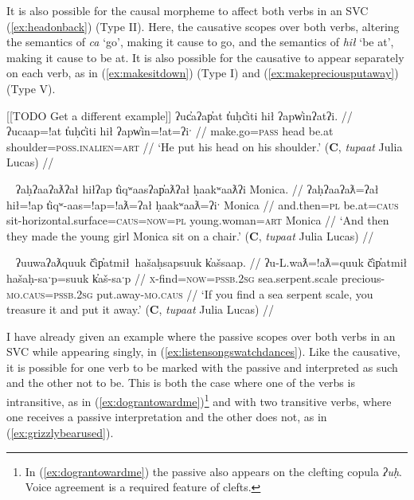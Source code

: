 It is also possible for the causal morpheme to affect both verbs in an SVC (\ref{ex:headonback}) (Type II). Here, the causative scopes over both verbs, altering the semantics of \textit{ca} `go', making it cause to go, and the semantics of \textit{hił} `be at', making it cause to be at. It is also possible for the causative to appear separately on each verb, as in (\ref{ex:makesitdown}) (Type I) and (\ref{ex:makepreciousputaway}) (Type V).

[[TODO Get a different example]]
\ex \label{ex:headonback}
\begingl
\glpreamble ʔuc̓aʔap̓at t̓uḥc̓iti hił ʔapw̓inʔatʔi. //
\gla ʔucaap=!at t̓uḥc̓iti hił ʔapw̓in=!at=ʔiˑ //
\glb make.go=\textsc{pass} head be.at shoulder=\textsc{poss.inalien}=\textsc{art} //
\glft `He put his head on his shoulder.' (\textbf{C}, \textit{tupaat} Julia Lucas) //
\endgl
\xe

\ex~ \label{ex:makesitdown}
\begingl
\glpreamble ʔaḥʔaaʔaƛʔał hiłʔap t̓iqʷaasʔap̓aƛʔał ḥaakʷaaƛʔi Monica. //
\gla ʔaḥʔaaʔaƛ=ʔał hił=!ap t̓iqʷ-aas=!ap=!aƛ=ʔał ḥaakʷaaƛ=ʔiˑ Monica //
\glb and.then=\textsc{pl} be.at=\textsc{caus} sit-horizontal.surface=\textsc{caus}=\textsc{now}=\textsc{pl} young.woman=\textsc{art} Monica //
\glft `And then they made the young girl Monica sit on a chair.' (\textbf{C}, \textit{tupaat} Julia Lucas) //
\endgl
\xe

\ex~ \label{ex:makepreciousputaway}
\begingl
\glpreamble ʔuuwaʔaƛquuk č̓ip̓atmił\footnotemark\ hašaḥsapsuuk k̓ašsaap. //
\gla ʔu-L.waƛ=!aƛ=quuk č̓ip̓atmił hašaḥ-saˑp=suuk k̓aš-saˑp //
\glb \textsc{x}-find=\textsc{now}=\textsc{pssb.2sg} sea.serpent.scale precious-\textsc{mo.caus}=\textsc{pssb.2sg} put.away-\textsc{mo.caus} //
\glft `If you find a sea serpent scale, you treasure it and put it away.' (\textbf{C}, \textit{tupaat} Julia Lucas) //
\endgl
\xe


I have already given an example where the passive scopes over both verbs in an SVC while appearing singly, in (\ref{ex:listensongswatchdances}). Like the causative, it is possible for one verb to be marked with the passive and interpreted as such and the other not to be. This is both the case where one of the verbs is intransitive, as in (\ref{ex:dograntowardme})\footnote{In (\ref{ex:dograntowardme}) the passive also appears on the clefting copula \textit{ʔuḥ}. Voice agreement is a required feature of clefts.} and with two transitive verbs, where one receives a passive interpretation and the other does not, as in (\ref{ex:grizzlybearused}).

